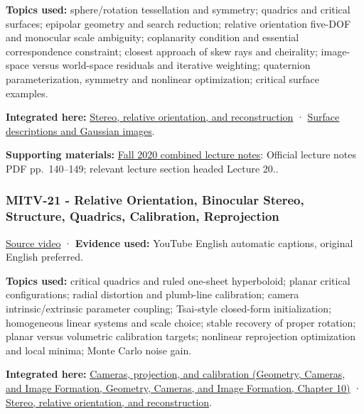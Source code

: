 \textbf{Topics used:} sphere/rotation tessellation and symmetry; quadrics and critical surfaces; epipolar geometry and search reduction; relative orientation five-DOF and monocular scale ambiguity; coplanarity condition and essential correspondence constraint; closest approach of skew rays and cheirality; image-space versus world-space residuals and iterative weighting; quaternion parameterization, symmetry and nonlinear optimization; critical surface examples.

\textbf{Integrated here:} \hyperref[04-visual-computing-ii-ch032-stereo-relative-orientation-and-reconstruction]{Stereo, relative orientation, and reconstruction} · \hyperref[04-visual-computing-ii-ch032-surface-descriptions-and-gaussian-images]{Surface descriptions and Gaussian images}.

\textbf{Supporting materials:} \href{https://ocw.mit.edu/courses/6-801-machine-vision-fall-2020/9ec44f69e72995c370b3797818ba01e6_MIT6_801F20_lectureNotes.pdf}{Fall 2020 combined lecture notes}: Official lecture notes PDF pp.~140--149; relevant lecture section headed Lecture 20..

\subsubsection{MITV-21 - Relative Orientation, Binocular Stereo, Structure, Quadrics, Calibration, Reprojection}\label{04-visual-computing-ii-ch036-mitv-21---relative-orientation-binocular-stereo-structure-quadrics-calibration-reprojection}

\href{https://www.youtube.com/watch?v=-n0cXgPSwOw}{Source video} · \textbf{Evidence used:} YouTube English automatic captions, original English preferred.

\textbf{Topics used:} critical quadrics and ruled one-sheet hyperboloid; planar critical configurations; radial distortion and plumb-line calibration; camera intrinsic/extrinsic parameter coupling; Tsai-style closed-form initialization; homogeneous linear systems and scale choice; stable recovery of proper rotation; planar versus volumetric calibration targets; nonlinear reprojection optimization and local minima; Monte Carlo noise gain.

\textbf{Integrated here:} \href{../03-Geometry-Cameras-and-Image-Formation/main.pdf\#nameddest=03-visual-computing-i-ch003-cameras-projection-and-calibration}{Cameras, projection, and calibration (Geometry, Cameras, and Image Formation, Geometry, Cameras, and Image Formation, Chapter 10)} · \hyperref[04-visual-computing-ii-ch032-stereo-relative-orientation-and-reconstruction]{Stereo, relative orientation, and reconstruction}.

